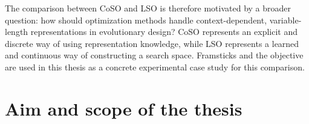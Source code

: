 The comparison between CoSO and LSO is therefore motivated by a broader question: how should optimization methods handle context-dependent, variable-length representations in evolutionary design? CoSO represents an explicit and discrete way of using representation knowledge, while LSO represents a learned and continuous way of constructing a search space. Framsticks \fone{} and the \vertpos{} objective are used in this thesis as a concrete experimental case study for this comparison.

\section{Aim and scope of the thesis}





